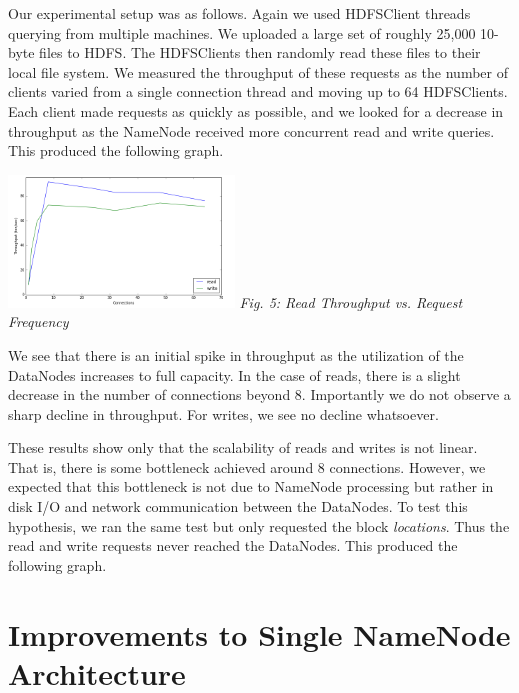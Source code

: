\documentclass[11pt, a4paper]{article}
\begin{document}
\begin{multicols*}{2}
Our experimental setup was as follows. Again we used HDFSClient threads querying from multiple machines. We uploaded a large set of roughly 25,000 10-byte files to HDFS. The HDFSClients then randomly read these files to their local file system. We measured the throughput of these requests as the number of clients varied from a single connection thread and moving up to 64 HDFSClients. Each client made requests as quickly as possible, and we looked for a decrease in throughput as the NameNode received more concurrent read and write queries. This produced the following graph.
\begin{center}
	\includegraphics[keepaspectratio=true, width=0.45\textwidth]{ConcurrencyResults}	
	\textit{Fig. 5: Read Throughput vs. Request Frequency}
\end{center}
We see that there is an initial spike in throughput as the utilization of the DataNodes increases to full capacity. In the case of reads, there is a slight decrease in the number of connections beyond 8. Importantly we do not observe a sharp decline in throughput. For writes, we see no decline whatsoever.

These results show only that the scalability of reads and writes is not linear. That is, there is some bottleneck achieved around 8 connections. However, we expected that this bottleneck is not due to NameNode processing but rather in disk I/O and network communication between the DataNodes. To test this hypothesis, we ran the same test but only requested the block \textit{locations}. Thus the read and write requests never reached the DataNodes. This produced the following graph.

\section{Improvements to Single NameNode Architecture}\label{Improvements}


\end{multicols*}
\end{document}
